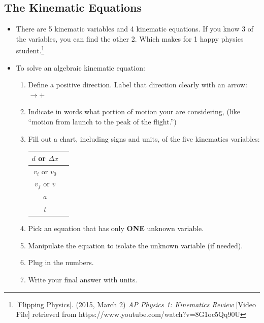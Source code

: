 \documentclass[letterpaper, 12pt]{article}
\begin{document}
\subsection*{The Kinematic Equations}
\begin{itemize}
	\item There are 5 kinematic variables and 4 kinematic equations.  If you know 3 of the variables, you can find the other 2.  Which makes for 1 happy physics student.\footnote{ [Flipping Physics].  (2015, March 2) \textit{AP Physics 1: Kinematics Review} [Video File] retrieved from https://www.youtube.com/watch?v=8G1oc5Qq90U }
	\item To solve an algebraic kinematic equation: 
		\begin{enumerate}
			\item Define a positive direction.  Label that direction clearly with an arrow: $\longrightarrow + $
			\item Indicate in words what portion of motion your are considering, (like ``motion from launch to the peak of the flight.”)
			\item Fill out a chart, including signs and units, of the five kinematics variables:
			\begin{center}
			\begin{tabular} {| c | c | }
				\hline
				$d$ or $\Delta x$  & \hspace{0.4in} \\
				\hline
				$v_i$ or $v_0$ & \hspace{0.4in} \\
				\hline
				$v_f$ or $v $ & \hspace{0.4in} \\
				\hline
				$a$ & \hspace{0.4in} \\
				\hline
				$t$ & \hspace{0.4in} \\
				\hline
			\end{tabular} 
			\end{center}
		\item Pick an equation that has only \textbf{ONE} unknown variable.  
		\item Manipulate the equation to isolate the unknown variable (if needed).
		\item Plug in the numbers.
		\item Write your final answer with units. 
			
		\end{enumerate}
	
\end{itemize}
\vspace{1in}
\end{document}
